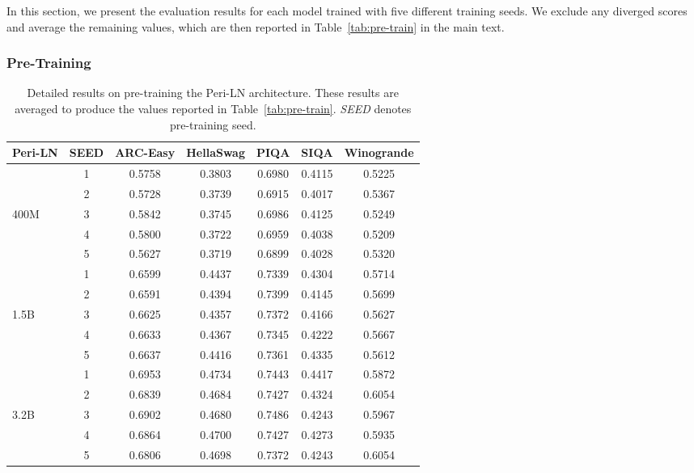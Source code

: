 In this section, we present the evaluation results for each model trained with five different training seeds. We exclude any diverged scores and average the remaining values, which are then reported in Table~\ref{tab:pre-train} in the main text.

\subsubsection{Pre-Training}
\begin{table}[!ht]
\vskip -0.1in
\small
\caption{Detailed results on pre-training the Peri-LN architecture. These results are averaged to produce the values reported in Table~\ref{tab:pre-train}. \textit{SEED} denotes pre-training seed.}
    \centering
    \begin{tabular}{lcccccc}
    \toprule
        Peri-LN & SEED & ARC-Easy & HellaSwag & PIQA & SIQA & Winogrande \\ 
        \toprule
        ~ & 1 & 0.5758 & 0.3803 & 0.6980 & 0.4115 & 0.5225 \\ 
        ~ & 2 & 0.5728 & 0.3739 & 0.6915 & 0.4017 & 0.5367 \\ 
        400M & 3 & 0.5842 & 0.3745 & 0.6986 & 0.4125 & 0.5249 \\ 
        ~ & 4 & 0.5800 & 0.3722 & 0.6959 & 0.4038 & 0.5209 \\ 
        ~ & 5 & 0.5627 & 0.3719 & 0.6899 & 0.4028 & 0.5320 \\ 
        \midrule
        ~ & 1 & 0.6599 & 0.4437 & 0.7339 & 0.4304 & 0.5714 \\ 
        ~ & 2 & 0.6591 & 0.4394 & 0.7399 & 0.4145 & 0.5699 \\ 
        1.5B & 3 & 0.6625 & 0.4357 & 0.7372 & 0.4166 & 0.5627 \\ 
        ~ & 4 & 0.6633 & 0.4367 & 0.7345 & 0.4222 & 0.5667 \\ 
        ~ & 5 & 0.6637 & 0.4416 & 0.7361 & 0.4335 & 0.5612 \\ 
        \midrule
        ~ & 1 & 0.6953 & 0.4734 & 0.7443 & 0.4417 & 0.5872 \\ 
        ~ & 2 & 0.6839 & 0.4684 & 0.7427 & 0.4324 & 0.6054 \\ 
        3.2B & 3 & 0.6902 & 0.4680 & 0.7486 & 0.4243 & 0.5967 \\ 
        ~ & 4 & 0.6864 & 0.4700 & 0.7427 & 0.4273 & 0.5935 \\ 
        ~ & 5 & 0.6806 & 0.4698 & 0.7372 & 0.4243 & 0.6054 \\ 
        \bottomrule
    \end{tabular}
    \vskip -0.1in
\end{table}

